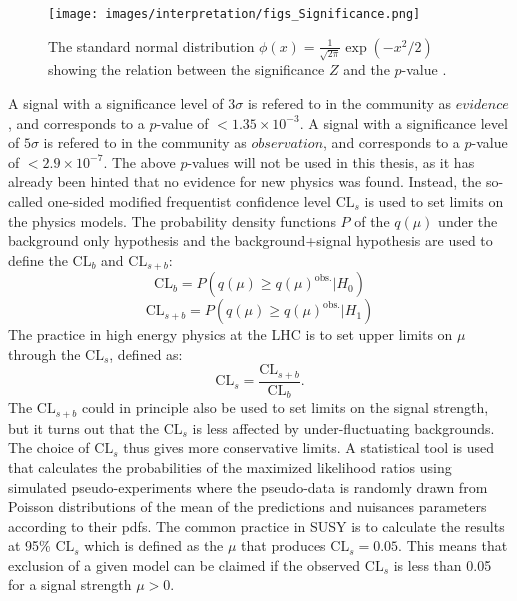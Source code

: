 \begin{figure}[!hbtp]
\centering
\texttt{[image: images/interpretation/figs\_Significance.png]}
\caption{The standard normal distribution $\phi(x)=\frac{1}{\sqrt{2\pi}}\exp(-x^{2}/2)$ showing the relation between the significance $Z$ and the $p$-value \cite{Cowan:2010js}.}
\label{fig:pvalue}
\end{figure}
A signal with a significance level of $3\sigma$ is refered to in the community as $evidence$, and corresponds to a $p$-value of $<1.35\times10^{-3}$. 
A signal with a significance level of $5\sigma$ is refered to in the community as $observation$, and corresponds to a $p$-value of $<2.9\times10^{-7}$. 
The above $p$-values will not be used in this thesis, as it has already been hinted that no evidence for new physics was found. 
Instead, the so-called one-sided modified frequentist confidence level $\mathrm{CL}_{s}$ is used to set limits on the physics models.                                                                 
The probability density functions $P$ of the $q(\mu)$ under the background only hypothesis and the background+signal hypothesis are used to define the $\mathrm{CL}_{b}$ and $\mathrm{CL}_{s+b}$:
\begin{equation}
\mathrm{CL}_{b}=P(q(\mu)\geq q(\mu)^{\mathrm{obs.}}|H_{0})
\end{equation} 
\begin{equation}
\mathrm{CL}_{s+b}=P(q(\mu)\geq q(\mu)^{\mathrm{obs.}}|H_{1})
\end{equation} 
The practice in high energy physics at the LHC is to set upper limits on $\mu$ through the $\mathrm{CL}_{s}$, defined as:
\begin{equation}
\mathrm{CL}_{s}=\frac{\mathrm{CL}_{s+b}}{\mathrm{CL}_{b}}.
\end{equation} 
The $\mathrm{CL}_{s+b}$ could in principle also be used to set limits on the signal strength, but it turns out that the $\mathrm{CL}_{s}$ is less affected by under-fluctuating backgrounds. 
The choice of $\mathrm{CL}_{s}$ thus gives more conservative limits. 
A statistical tool is used that calculates the probabilities of the maximized likelihood ratios using simulated pseudo-experiments where the pseudo-data is randomly drawn from Poisson distributions of the mean of the predictions and nuisances parameters according to their pdfs. 
The common practice in SUSY is to calculate the results at 95\% $\mathrm{CL}_{s}$ which is defined as the $\mu$ that produces $\mathrm{CL}_{s}=0.05$.
This means that exclusion of a given model can be claimed if the observed $\mathrm{CL}_{s}$ is less than 0.05 for a signal strength $\mu>0$. 
